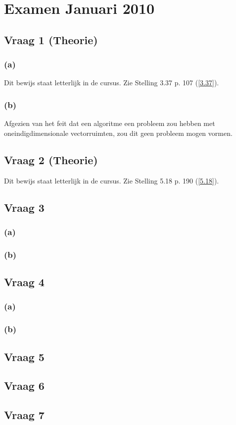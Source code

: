 \documentclass[lineaire_algebra_oplossingen.tex]{subfiles}
\begin{document}
\section{Examen Januari 2010}
\subsection{Vraag 1 (Theorie)}
\subsubsection*{(a)}
Dit bewijs staat letterlijk in de cursus. Zie Stelling 3.37 p. 107 (\ref{3.37}).

\subsubsection*{(b)}
Afgezien van het feit dat een algoritme een probleem zou hebben met oneindigdimensionale vectorruimten, zou dit geen probleem mogen vormen.

\subsection{Vraag 2 (Theorie)}
Dit bewijs staat letterlijk in de cursus. Zie Stelling 5.18 p. 190 (\ref{5.18}).
\subsection{Vraag 3}
\subsubsection*{(a)}
\subsubsection*{(b)}
\subsection{Vraag 4}
\subsubsection*{(a)}
\subsubsection*{(b)}
\subsection{Vraag 5}
\subsection{Vraag 6}
\subsection{Vraag 7}
\end{document}
